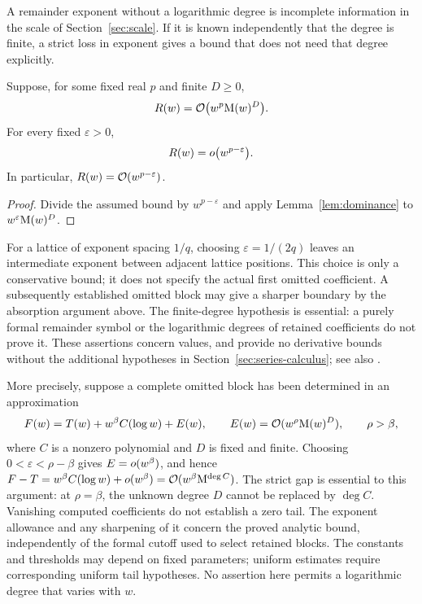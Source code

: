 A remainder exponent without a logarithmic degree is incomplete
information in the scale of Section~\ref{sec:scale}. If it is known
independently that the degree is finite, a strict loss in exponent gives
a bound that does not need that degree explicitly.

\begin{lemma}
\label{lem:special-function-logarithmic-margin}
Suppose, for some fixed real $p$ and finite $D\ge0$,
\[
 R(w)=\mathcal O\bigl(w^p\mathrm M(w)^D\bigr).
\]
For every fixed $\varepsilon>0$,
\[
 R(w)=o\bigl(w^{p-\varepsilon}\bigr).
\]
In particular, $R(w)=\mathcal O(w^{p-\varepsilon})$.
\end{lemma}
\begin{proof}
Divide the assumed bound by $w^{p-\varepsilon}$ and apply
Lemma~\ref{lem:dominance} to $w^\varepsilon\mathrm M(w)^D$.
\end{proof}

For a lattice of exponent spacing $1/q$, choosing
$\varepsilon=1/(2q)$ leaves an intermediate exponent between adjacent
lattice positions. This choice is only a conservative bound; it does not
specify the actual first omitted coefficient. A subsequently established
omitted block may give a sharper boundary by the absorption argument
above. The finite-degree hypothesis is essential: a purely formal
remainder symbol or the logarithmic degrees of retained coefficients do
not prove it. These assertions concern values, and provide no derivative
bounds without the additional hypotheses in
Section~\ref{sec:series-calculus}; see also \cite[\S2.1(iii)]{dlmf}.

More precisely, suppose a complete omitted block has been determined in
an approximation
\[
 F(w)=T(w)+w^\beta C(\log w)+E(w),\qquad
 E(w)=\mathcal O(w^\rho\mathrm M(w)^D),\qquad \rho>\beta,
\]
where $C$ is a nonzero polynomial and $D$ is fixed and finite.
Choosing $0<\varepsilon<\rho-\beta$ gives $E=o(w^\beta)$, and hence
$F-T=w^\beta C(\log w)+o(w^\beta)
=\mathcal O(w^\beta\mathrm M^{\deg C})$. The strict gap is essential to this
argument: at $\rho=\beta$, the unknown degree $D$ cannot be replaced by
$\deg C$. Vanishing computed coefficients do not establish a zero
tail. The exponent allowance and any sharpening of it concern the
proved analytic bound, independently of the formal cutoff used to
select retained blocks. The constants and thresholds may depend on
fixed parameters; uniform estimates require corresponding uniform tail
hypotheses. No assertion here permits a logarithmic degree that varies
with $w$.

